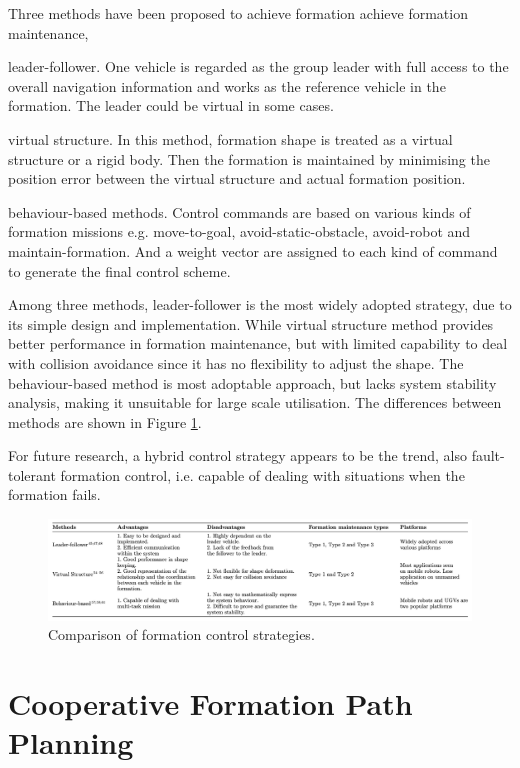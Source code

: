 \documentclass[letterpaper,12pt]{article}
\begin{document}
Three methods have been proposed to achieve formation achieve formation maintenance, 

\begin{compactenum}
	\item leader-follower. One vehicle is regarded as the group leader with full access to the overall navigation information and works as the reference vehicle in the formation. The leader could be virtual in some cases.
	\item virtual structure. In this method, formation shape is treated as a virtual structure or a rigid body. Then the formation is maintained by minimising the position error between the virtual structure and actual formation position.
	\item behaviour-based methods. Control commands are based on various kinds of formation missions e.g. move-to-goal, avoid-static-obstacle, avoid-robot and maintain-formation. And a weight vector are assigned to each kind of command to generate the final control scheme.
\end{compactenum}

Among three methods, leader-follower is the most widely adopted strategy, due to its simple design and implementation. 
While virtual structure method provides better performance in formation maintenance, but with limited capability to deal with collision avoidance since it has no flexibility to adjust the shape. 
The behaviour-based method is most adoptable approach, but lacks system stability analysis, making it unsuitable for large scale utilisation. 
The differences between methods are shown in Figure \ref{fig:diffformationmethods}. 

For future research, a hybrid control strategy appears to be the trend, also fault-tolerant formation control, i.e. capable of dealing with situations when the formation fails.

\begin{figure}
	\centering
	\includegraphics[width=7in]{diffformationmethods.png}
	\caption{Comparison of formation control strategies.}
	\label{fig:diffformationmethods} 
\end{figure}

\section{Cooperative Formation Path Planning}
\end{document}
